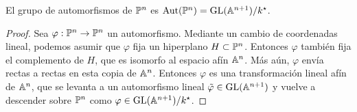 \begin{theorem}
El grupo de automorfismos de $\P^n$ es $\Aut(\P^n) = \GL(\A^{n+1}) / k^\star$.
\end{theorem}

\begin{proof}
Sea $\varphi : \P^n \to \P^n$ un automorfismo. Mediante un cambio de coordenadas lineal, podemos asumir que $\varphi$ fija un hiperplano $H \subset \P^n$. Entonces $\varphi$ también fija el complemento de $H$, que es isomorfo al espacio afín $\A^n$. Más aún, $\varphi$ envía rectas a rectas en esta copia de $\A^n$. Entonces $\varphi$ es una transformación lineal afín de $\A^n$, que se levanta a un automorfismo lineal $\tilde \varphi \in \GL(\A^{n+1})$ y vuelve a descender sobre $\P^n$ como $\varphi \in \GL(\A^{n+1}) / k^\star$.
\end{proof}

